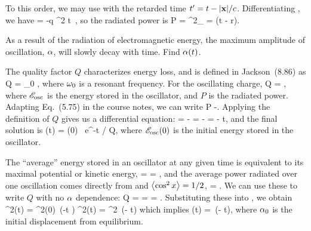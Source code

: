 \begin{solution}
	To this order, we may use  with the retarded time $t' = t - \abs{\vb{x}} / c$.  Differentiating , we have
	\beq
		 = -q \alp \omg^2 \cos \omg t \,\zh,
	\eeq
	so the radiated power is
	\beqn \label{radpow}
		P =  ^2_\ret
		=  \cos[2](\omg t -  r).
	\eeqn
	\vfix
\end{solution}



\begin{problem}
	As a result of the radiation of electromagnetic energy, the maximum amplitude of oscillation, $\alpha$, will slowly decay with time.  Find $\alpha(t)$.
\end{problem}

\begin{solution}
	The quality factor $Q$ characterizes energy loss, and is defined in Jackson~(8.86) as
	\beq
		Q = \omg_0 ,
	\eeq
	where $\omega_0$ is a resonant frequency.  For the oscillating charge,
	\beq
		Q = \omg {},
	\eeq
	where $\mathscr{E}_\text{osc}$ is the energy stored in the oscillator, and $P$ is the radiated power.  Adapting Eq.~(5.75) in the course notes, we can write
	\beq
		P \equiv -.
	\eeq
	Applying the definition of $Q$ gives us a differential equation:
	\beq
		 = - \sEosc
		\qimplies
		\int \frac{\dd{\sEosc}}{\sEosc} = - \int {}
		\qimplies
		\ln{} = - t,
	\eeq
	and the final solution is
	\beqn \label{ensol}
		\sEosc(t) = \sEosc(0) \, e^{-\omg t / Q},
	\eeqn
	where $\mathscr{E}_\text{osc}(0)$ is the initial energy stored in the oscillator.
	
	The ``average'' energy stored in an oscillator at any given time is equivalent to its maximal potential or kinetic energy,
	\beq
		\ev{\sEosc} =  = ,
	\eeq
	and the average power radiated over one oscillation comes directly from  and $\ev{\cos^2x} = 1/2$,
	\beq
		 = .
	\eeq
	We can use these to write $Q$ with no $\alpha$ dependence:
	\beq
		Q = \omg {}
		= \omg {} 
		= .
	\eeq
	Substituting these into , we obtain
	\beq
		 \alp^2(t) =  \alp^2(0) \,\exp(-\omg t )
		\qimplies
		\alp^2(t) = \alpo^2 \,\exp(- t)
	\eeq
	which implies
	\beq
		\alp(t) = \alpo \,\exp(- t),
	\eeq
	where $\alpha_0$ is the initial displacement from equilibrium.
\end{solution}